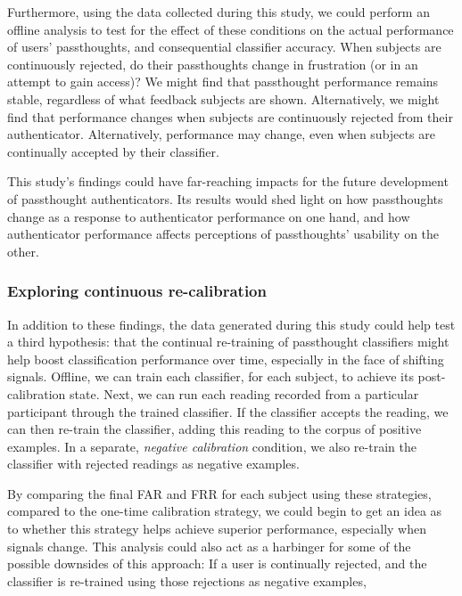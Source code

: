 \documentclass[sigconf]{acmart}
\begin{document}
Furthermore, using the data collected during this study, we could perform an offline analysis 
to test for the effect of these conditions on the actual performance of users' passthoughts, and consequential classifier accuracy.
When subjects are continuously rejected, do their passthoughts change in frustration (or in an attempt to gain access)?
We might find that passthought performance 
remains stable, regardless of what feedback subjects are shown.
Alternatively, we might find that performance changes 
when subjects are continuously rejected from their authenticator.
Alternatively, performance may change, 
even when subjects are continually accepted by their classifier.

This study's findings could have far-reaching impacts for the future development of passthought authenticators.
Its results would shed light on how passthoughts change as a response to authenticator performance on one hand,
and how authenticator performance affects perceptions of passthoughts' usability on the other.

\subsubsection{Exploring continuous re-calibration}
\label{sec:orgfd1298c}

In addition to these findings, the data generated during this study could help test 
a third hypothesis: that the continual re-training of passthought classifiers might help boost classification performance over time,
especially in the face of shifting signals.
Offline, we can train each classifier, for each subject, to achieve its post-calibration state.
Next, we can run each reading recorded from a particular participant through the trained classifier.
If the classifier accepts the reading, we can then re-train the classifier, 
adding this reading to the corpus of positive examples.
In a separate, \emph{negative calibration} condition, 
we also re-train the classifier with rejected readings as negative examples.

By comparing the final FAR and FRR for each subject using these strategies, 
compared to the one-time calibration strategy, we could begin to get an idea as to whether
this strategy helps achieve superior performance, especially when signals change.
This analysis could also act as a harbinger for some of the possible downsides of this approach:
If a user is continually rejected, and the classifier is re-trained using those rejections as negative examples,
\end{document}
